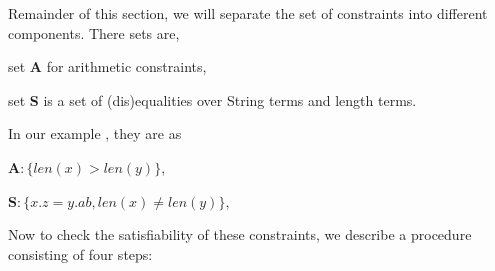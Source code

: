 	Remainder of this section, we will separate the set of constraints into different components. There sets are, 
	\begin{inparaenum}
		\item set \textbf{A} for arithmetic constraints, 
		\item set \textbf{S}  is a set of (dis)equalities over String terms and length terms.
   \end{inparaenum}
   In our example , they are as
   \begin{description}
   	\item \(  \textbf{A} : \{ len(x) > len(y) \}  \), 
   	\item \(  \textbf{S} : \{  x.z = y.ab, len(x) \neq len(y) \}  \), 
   	\end{description} 
   	
   	Now to check the satisfiability of these constraints, we describe a procedure consisting of four steps: 
   	   	
